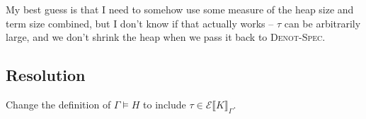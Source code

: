 \documentclass[a4paper, 10pt]{article}
\newcommand{\KEval}[2][\Gamma]{\mathscr{E}\llbracket #2 \rrbracket_{#1}}
\begin{document}
My best guess is that I need to somehow use some measure of the heap size and
term size combined, but I don't know if that actually works -- $\tau$ can be
arbitrarily large, and we don't shrink the heap when we pass it back to
\textsc{Denot-Spec}.

\subsection{Resolution}

Change the definition of $\Gamma \models H$ to include $\tau \in \KEval{K}$.
\end{document}

